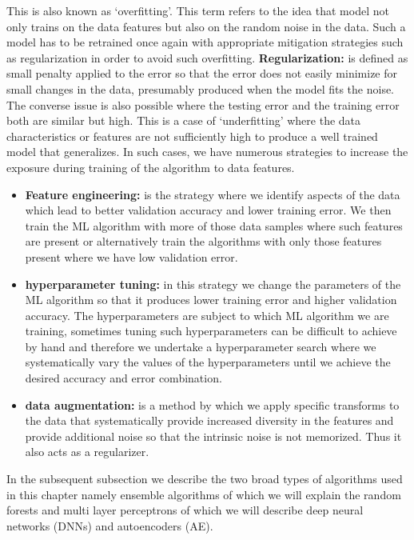 This is also known as `overfitting'. 
This term refers to the idea that model not only trains on the data features but also on the random noise in the data.
Such a model has to be retrained once again with appropriate mitigation strategies such as regularization in order to avoid such overfitting.
\textbf{Regularization:} is defined as small penalty applied to the error so that the error does not easily minimize for small changes in the data, presumably produced when the model fits the noise.
The converse issue is also possible where the testing error and the training error both are similar but high. 
This is a case of `underfitting' where the data characteristics or features are not sufficiently high to produce a well trained model that generalizes.
In such cases, we have numerous strategies to increase the exposure during training of the algorithm to data features.
\begin{itemize}
    \item \textbf{Feature engineering:} is the strategy where we identify aspects of the data which lead to better validation accuracy and lower training error. 
    We then train the ML algorithm with more of those data samples where such features are present or alternatively train the algorithms with only those features present where we have low validation error.
    \item \textbf{hyperparameter tuning:} in this strategy we change the parameters of the ML algorithm so that it produces lower training error and higher validation accuracy.
    The hyperparameters are subject to which ML algorithm we are training, sometimes tuning such hyperparameters can be difficult to achieve by hand and therefore we undertake a hyperparameter search where we systematically vary the values of the hyperparameters until we achieve the desired accuracy and error combination.
    \item \textbf{data augmentation:} is a method by which we apply specific transforms to the data that systematically provide increased diversity in the features and provide additional noise so that the intrinsic noise is not memorized.
    Thus it also acts as a regularizer.
\end{itemize}

In the subsequent subsection we describe the two broad types of algorithms used in this chapter namely ensemble algorithms of which we will explain the random forests and multi layer perceptrons of which we will describe deep neural networks (DNNs) and autoencoders (AE).
